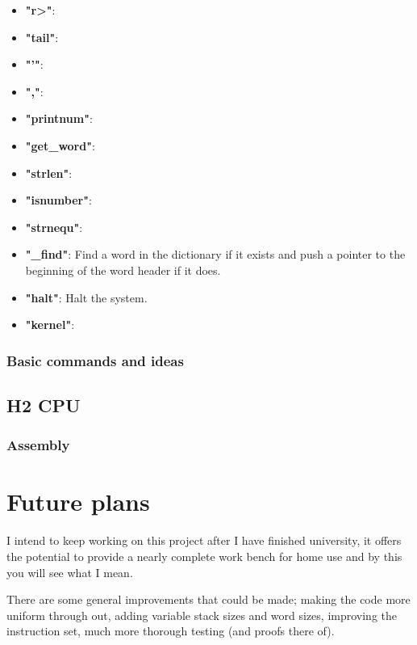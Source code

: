 \documentclass	[a4paper, 10pt]	{article}
\begin{document}
\begin{itemize}
        \item \textbf{"r>"}:
        \item \textbf{"tail"}:
        \item \textbf{"'"}:
        \item \textbf{","}:
        \item \textbf{"printnum"}:
        \item \textbf{"get\_word"}:
        \item \textbf{"strlen"}:
        \item \textbf{"isnumber"}:
        \item \textbf{"strnequ"}:
        \item \textbf{"\_find"}: Find a word in the dictionary if it
        exists and push a pointer to the beginning of the word header if
        it does.
        \item \textbf{"halt"}: Halt the system.
        \item \textbf{"kernel"}:
      \end{itemize}
      

      \subsubsection{Basic commands and ideas}
    \subsection{H2 CPU}
      \subsubsection{Assembly}

   \section{Future plans}

    I intend to keep working on this project after I have finished university, it offers the
    potential to provide a nearly complete work bench for home use and by this you will see
    what I mean.

    There are some general improvements that could be made; making the code more uniform
    through out, adding variable stack sizes and word sizes, improving the instruction set,
    much more thorough testing (and proofs there of).
\end{document}
